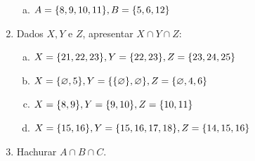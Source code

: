 \documentclass[a4paper,14pt]{article}
\begin{document}
\begin{multicols}{2}
\begin{enumerate}
\begin{enumerate}[a)]
    					\item $A = \{8, 9, 10, 11\}, \\ B = \{5, 6, 12\}$
    				\end{enumerate}
    				\item Dados $X, Y$ e $Z$, apresentar $X \cap Y \cap Z$:
    				\begin{enumerate}[a)]
    					\item $X = \{21, 22, 23\}, \\ Y = \{22, 23\}, \\ Z = \{23, 24, 25\}$
    					\item $X = \{\varnothing, 5\}, \\ Y = \{\{\varnothing\}, \varnothing\}, \\ Z = \{\varnothing, 4, 6\}$
    					\item $X = \{8, 9\}, Y = \{9, 10\}, \\ Z = \{10, 11\}$
    					\item $X = \{15, 16\}, \\ Y = \{15, 16, 17, 18\}, \\ Z = \{14, 15, 16\}$ 
    				\end{enumerate}
    				\item Hachurar $A \cap B \cap C$.

\end{enumerate}
\end{multicols}
\end{document}
